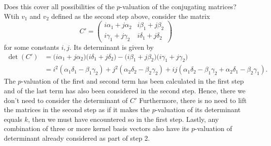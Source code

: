 \documentclass[letterpaper,12pt]{article}
\begin{document}
Does this cover all possibilities of the $p$-valuation of the conjugating matrices?
Wtih $v_1$ and $v_2$ defined as the second step above, consider the matrix 
\[
C' = \begin{pmatrix}
i\alpha_1 + j\alpha_2 & i\beta_1 + j\beta_2 \\
i\gamma_1 + j\gamma_2 & i\delta_1 + j\delta_2
\end{pmatrix}
\]
for some constants $i, j$.
Its determinant is given by 
\begin{align*}
\det(C') &= \big(i\alpha_{1} + j\alpha_{2}\big)\big(i\delta_{1} + j\delta_{2}\big)-
\big(i\beta_{1} + j\beta_{2}\big)\big(i\gamma_{1} + j\gamma_{2}\big) \\
&= i^2(\alpha_1 \delta_1 - \beta_1 \gamma_2) + j^2(\alpha_2 \delta_2 - \beta_2 \gamma_2)
+ ij(\alpha_1 \delta_2 - \beta_1 \gamma_2 + \alpha_2 \delta_1 - \beta_2 \gamma_1).
\end{align*}
The $p$-valuation of the first and second term has been calculated in the first step
and of the last term has also been considered in the second step.
Hence, there we don't need to consider the determinant of $C'$
Furthermore, there is no need to lift the matrices in the second step
as if it makes the $p$-valuation of its determinant equals $k$, then 
we must have encountered so in the first step.
Lastly, any combination of three or more kernel basis vectors also 
have its $p$-valuation of determinant already considered as part of step 2.

\


\end{document}
